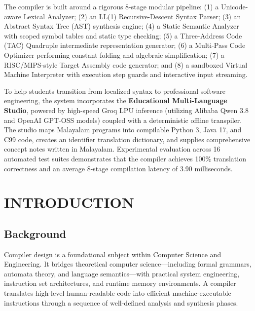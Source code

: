 \documentclass[12pt,a4paper]{report}
\begin{document}
\vspace{0.3cm}
\noindent The compiler is built around a rigorous 8-stage modular pipeline: (1) a Unicode-aware Lexical Analyzer; (2) an LL(1) Recursive-Descent Syntax Parser; (3) an Abstract Syntax Tree (AST) synthesis engine; (4) a Static Semantic Analyzer with scoped symbol tables and static type checking; (5) a Three-Address Code (TAC) Quadruple intermediate representation generator; (6) a Multi-Pass Code Optimizer performing constant folding and algebraic simplification; (7) a RISC/MIPS-style Target Assembly code generator; and (8) a sandboxed Virtual Machine Interpreter with execution step guards and interactive input streaming.

\vspace{0.3cm}
\noindent To help students transition from localized syntax to professional software engineering, the system incorporates the \textbf{Educational Multi-Language Studio}, powered by high-speed Groq LPU inference (utilizing Alibaba Qwen 3.8 and OpenAI GPT-OSS models) coupled with a deterministic offline transpiler. The studio maps Malayalam programs into compilable Python 3, Java 17, and C99 code, creates an identifier translation dictionary, and supplies comprehensive concept notes written in Malayalam. Experimental evaluation across 16 automated test suites demonstrates that the compiler achieves 100\% translation correctness and an average 8-stage compilation latency of 3.90 milliseconds.

\newpage
\tableofcontents

\newpage
\listoffigures

\newpage
\listoftables

\newpage
{}
\setcounter{page}{1}

\chapter{INTRODUCTION}

\section{Background}
Compiler design is a foundational subject within Computer Science and Engineering. It bridges theoretical computer science—including formal grammars, automata theory, and language semantics—with practical system engineering, instruction set architectures, and runtime memory environments. A compiler translates high-level human-readable code into efficient machine-executable instructions through a sequence of well-defined analysis and synthesis phases.
\end{document}
